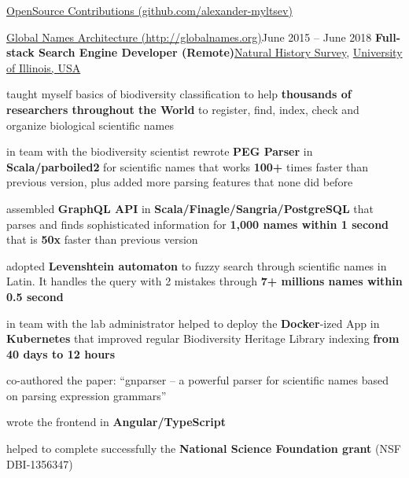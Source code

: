 \documentclass{resume} %
\begin{document}
\begin{rSection}{\href{https://github.com/alexander-myltsev?tab=repositories}{OpenSource
Contributions (github.com/alexander-myltsev)}}
\begin{samepage}
\begin{rSubsection}{\href{http://globalnames.org/}{Global Names Architecture
(http://globalnames.org)}}{June 2015 -- June 2018}
{\textbf{Full-stack Search Engine Developer (Remote)}}{\href{http://www.inhs.illinois.edu/}{Natural History Survey},
\href{http://illinois.edu/}{University of Illinois, USA}}
\item taught myself basics of biodiversity classification to help \textbf{thousands of researchers throughout the World} to register, find, index, check and organize
biological scientific names
\item in team with the biodiversity scientist rewrote \textbf{PEG Parser} in \textbf{Scala/parboiled2} for scientific names that works \textbf{100+} times faster than previous version, plus added more parsing features that none did before
\item assembled \textbf{GraphQL API} in \textbf{Scala/Finagle/Sangria/PostgreSQL} that parses and
finds sophisticated information for \textbf{1,000 names within 1 second} that is \textbf{50x} faster
than previous version
\item adopted \textbf{Levenshtein automaton} to fuzzy search through scientific names in Latin.
It handles the query with 2 mistakes through \textbf{7+ millions names within 0.5 second}
\item in team with the lab administrator helped to deploy the \textbf{Docker}-ized App in \textbf{Kubernetes} that improved regular Biodiversity Heritage Library indexing \textbf{from 40 days to 12 hours}
\item co-authored the paper: ``gnparser -- a powerful parser for scientific names based on parsing expression
grammars''
\item wrote the frontend in \textbf{Angular/TypeScript}
\item helped to complete successfully the \textbf{National Science Foundation grant} (NSF DBI-1356347)
\end{rSubsection}
\end{samepage}


\end{rSection}
\end{document}
